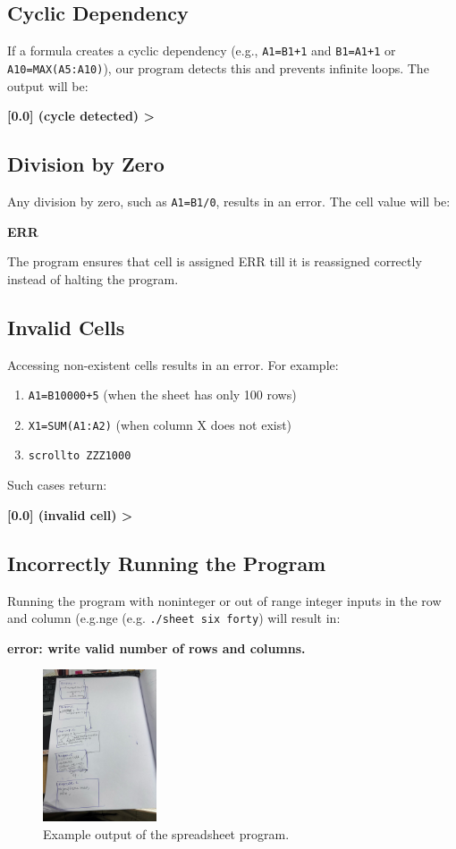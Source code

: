 \documentclass[a4paper]{article}
\begin{document}
\subsection{Cyclic Dependency}
If a formula creates a cyclic dependency (e.g., \texttt{A1=B1+1} and \texttt{B1=A1+1} or \texttt{A10=MAX(A5:A10)}), our program detects this and prevents infinite loops. The output will be:
\begin{center}
    \textbf{[0.0] (cycle detected) >}
\end{center}

\subsection{Division by Zero}
Any division by zero, such as \texttt{A1=B1/0}, results in an error. The cell value will be:
\begin{center}
    \textbf{ERR}
\end{center}
The program ensures that cell is assigned ERR till it is reassigned correctly instead of halting the program.

\subsection{Invalid Cells}
Accessing non-existent cells results in an error. For example:
\begin{enumerate}
    \item \texttt{A1=B10000+5} (when the sheet has only 100 rows)
    \item \texttt{X1=SUM(A1:A2)} (when column X does not exist)
    \item \texttt{scrollto ZZZ1000} 
\end{enumerate}
Such cases return:
\begin{center}
    \textbf{[0.0] (invalid cell) >}
\end{center}

\subsection{Incorrectly Running the Program}
Running the program with noninteger or out of range integer inputs in the row and column (e.g.nge (e.g. \texttt{./sheet six forty}) will result in:
\begin{center}
    \textbf{error: write valid number of rows and columns.}
\end{center}

\begin{figure}
\centering
\includegraphics[width=0.3\textwidth]{copass.jpg}
\caption{Example output of the spreadsheet program.}
\end{figure}
\end{document}
